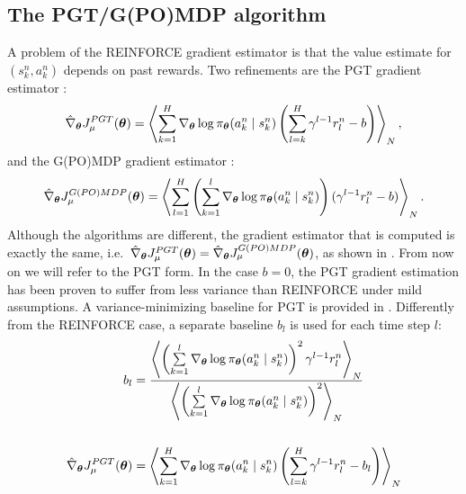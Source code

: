 \subsection{The PGT/G(PO)MDP algorithm}
A problem of the REINFORCE gradient estimator is that the value estimate for $(s_k^n,a_k^n)$ depends on past rewards. Two refinements are the PGT gradient estimator \cite{Sutton2000policy}:
\[
	\hat{\nabla}_{\boldsymbol{\theta}}J_{\mu}^{PGT}(\boldsymbol{\theta}) = 
		\left\langle
		\sum\limits_{k=1}^H\nabla_{\boldsymbol{\theta}}\log\pi_{\boldsymbol{\theta}}(a_k^n \mid s_k^n)
		\left(\sum\limits_{l=k}^H\gamma^{l-1}r_l^n-b\right)\right\rangle_N,
\]
and the G(PO)MDP gradient estimator \cite{Baxter2001infinite}:
\[
	\hat{\nabla}_{\boldsymbol{\theta}}J_{\mu}^{G(PO)MDP}(\boldsymbol{\theta}) = 
			\left\langle
			\sum\limits_{l=1}^H\left(\sum\limits_{k=1}^l
			\nabla_{\boldsymbol{\theta}}\log\pi_{\boldsymbol{\theta}}(a_k^n \mid s_k^n)\right)
			(\gamma^{l-1}r_l^n-b)\right\rangle_N.
\]
Although the algorithms are different, the gradient estimator that is computed is exactly the same, i.e.\ $\hat{\nabla}_{\boldsymbol{\theta}}J_{\mu}^{PGT}(\boldsymbol{\theta}) = \hat{\nabla}_{\boldsymbol{\theta}}J_{\mu}^{G(PO)MDP}(\boldsymbol{\theta})$, as shown in \cite{Peters2008reinf}. From now on we will refer to the PGT form.
In the case $b=0$, the PGT gradient estimation has been proven to suffer from less variance than REINFORCE \cite{Zhao2011a} under mild assumptions. A variance-minimizing baseline for PGT is provided in \cite{Peters2008reinf}. Differently from the REINFORCE case, a separate baseline $b_l$ is used for each time step $l$:
\begin{align*}
	b_l &= \frac{\left\langle\left(\sum\limits_{k=1}^l\nabla_{\boldsymbol{\theta}}\log\pi_{\boldsymbol{\theta}}(a_k^n \mid s_k^n)\right)^2
		\gamma^{l-1}r_l^n\right\rangle_N}
		{\left\langle\left(\sum\limits_{k=1}^l\nabla_{\boldsymbol{\theta}}\log\pi_{\boldsymbol{\theta}}(a_k^n \mid s_k^n)\right)^2
		\right\rangle_N} \\\\
	\hat{\nabla}_{\boldsymbol{\theta}}J_{\mu}^{PGT}(\boldsymbol{\theta}) &= 
		\left\langle
		\sum\limits_{k=1}^H\nabla_{\boldsymbol{\theta}}\log\pi_{\boldsymbol{\theta}}(a_k^n \mid s_k^n)			\left(\sum\limits_{l=k}^H\gamma^{l-1}r_l^n-b_l\right)\right\rangle_N	
\end{align*}


